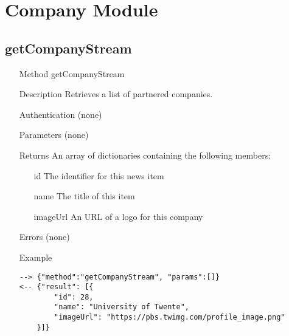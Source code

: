 \documentclass[a4paper]{scrreprt}
\begin{document}
\clearpage
\section{Company Module}
\subsection{getCompanyStream}
\begin{enumerate}
\item[Method] getCompanyStream
\item[Description] Retrieves a list of partnered companies.
\item[Authentication] (none)
\item[Parameters] (none)
\item[Returns] An array of dictionaries containing the following members:
\begin{enumerate}
    \item[id] The identifier for this news item
    \item[name] The title of this item
    \item[imageUrl] An URL of a logo for this company
	\end{enumerate}
\item[Errors] (none)
\item[Example]
\begin{lstlisting}
--> {"method":"getCompanyStream", "params":[]}
<-- {"result": [{
        "id": 28,
        "name": "University of Twente",
        "imageUrl": "https://pbs.twimg.com/profile_image.png"
    }]}
\end{lstlisting}
\end{enumerate}
\end{document}
